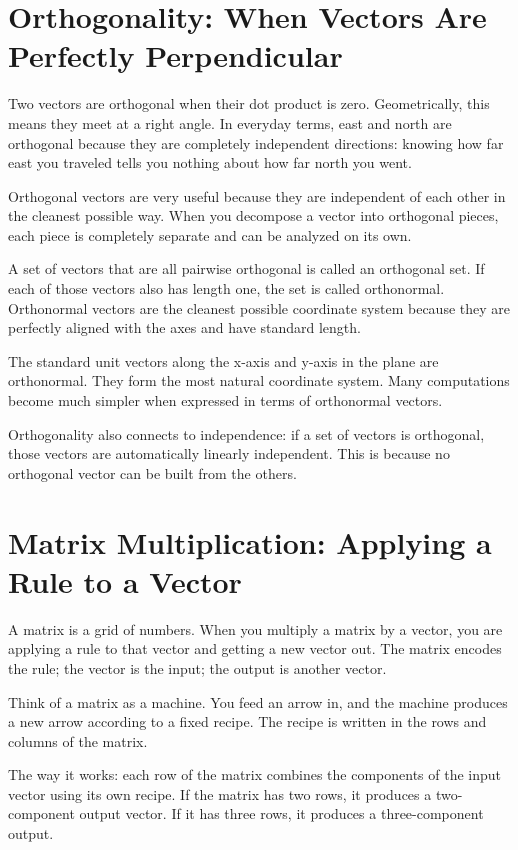 \documentclass[11pt]{article}
\begin{document}
\section*{Orthogonality: When Vectors Are Perfectly Perpendicular}

Two vectors are orthogonal when their dot product is zero. Geometrically, this means they meet at a right angle. In everyday terms, east and north are orthogonal because they are completely independent directions: knowing how far east you traveled tells you nothing about how far north you went.

Orthogonal vectors are very useful because they are independent of each other in the cleanest possible way. When you decompose a vector into orthogonal pieces, each piece is completely separate and can be analyzed on its own.

A set of vectors that are all pairwise orthogonal is called an orthogonal set. If each of those vectors also has length one, the set is called orthonormal. Orthonormal vectors are the cleanest possible coordinate system because they are perfectly aligned with the axes and have standard length.

The standard unit vectors along the x-axis and y-axis in the plane are orthonormal. They form the most natural coordinate system. Many computations become much simpler when expressed in terms of orthonormal vectors.

Orthogonality also connects to independence: if a set of vectors is orthogonal, those vectors are automatically linearly independent. This is because no orthogonal vector can be built from the others.

\section*{Matrix Multiplication: Applying a Rule to a Vector}

A matrix is a grid of numbers. When you multiply a matrix by a vector, you are applying a rule to that vector and getting a new vector out. The matrix encodes the rule; the vector is the input; the output is another vector.

Think of a matrix as a machine. You feed an arrow in, and the machine produces a new arrow according to a fixed recipe. The recipe is written in the rows and columns of the matrix.

The way it works: each row of the matrix combines the components of the input vector using its own recipe. If the matrix has two rows, it produces a two-component output vector. If it has three rows, it produces a three-component output.
\end{document}
